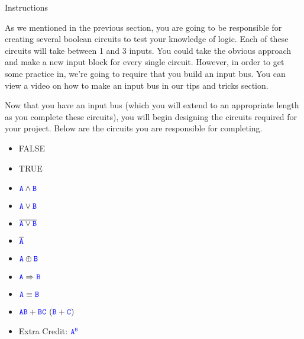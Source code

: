 \documentclass{article}
\begin{document}
\begin{subenv}{Instructions}
        \par As we mentioned in the previous section, you are going to be responsible for creating several boolean circuits to test your knowledge of logic.  Each of these circuits will take between 1 and 3 inputs.  You could take the obvious approach and make a new input block for every single circuit.  However, in order to get some practice in, we're going to require that you build an input bus.  You can view a video on how to make an input bus in our tips and tricks section.
        
        \par Now that you have an input bus (which you will extend to an appropriate length as you complete these circuits), you will begin designing the circuits required for your project.  Below are the circuits you are responsible for completing.  
        
        \begin{tcolorbox}
            \begin{itemize}[noitemsep]
            \renewcommand{\labelitemi}{\scriptsize$\blacksquare$}
                \item FALSE \hfill  {}
                \item TRUE  \hfill  {}
                \item $\textcolor{blue}{\texttt{A}} \land \textcolor{blue}{\texttt{B}}$ \hfill {}
                \item $\textcolor{blue}{\texttt{A}} \lor \textcolor{blue}{\texttt{B}}$ \hfill {}
                \item $\overline{\textcolor{blue}{\texttt{A}} \lor \textcolor{blue}{\texttt{B}}}$ \hfill  {}
                \item $\overline{\textcolor{blue}{\texttt{A}}}$ \hfill {}
                \item $\textcolor{blue}{\texttt{A}} \oplus \textcolor{blue}{\texttt{B}}$ \hfill  {}
                \item $\textcolor{blue}{\texttt{A}} \Rightarrow \textcolor{blue}{\texttt{B}}$ \hfill  {}
                \item $\textcolor{blue}{\texttt{A}} \equiv \textcolor{blue}{\texttt{B}}$ \hfill {}
                \item $\textcolor{blue}{\texttt{A}}\textcolor{blue}{\texttt{B}} + \textcolor{blue}{\texttt{B}}\textcolor{blue}{\texttt{C}} \ (\textcolor{blue}{\texttt{B}} + \textcolor{blue}{\texttt{C}})$ \hfill  {}
                \item Extra Credit: $\textcolor{blue}{\texttt{A}}^{\textcolor{blue}{\texttt{B}}}$ \hfill  {}
            \end{itemize}
        \end{tcolorbox}
        

\end{subenv}
\end{document}
